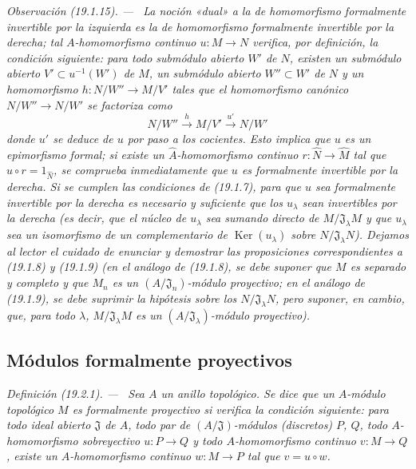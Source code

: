 \documentclass[10pt,oneside]{book}
\makeatletter
\newcommand{\setmanualcurrentlabel}[1]{\def\@currentlabel{#1}}
\newenvironment{definition}[1][]{%
  \setmanualcurrentlabel{#1}\par\medskip\noindent\itshape Definición (#1). ---\ }{\par}
\newenvironment{remark}[1][]{%
  \setmanualcurrentlabel{#1}\par\medskip\noindent\itshape Observación (#1). ---\ }{\par}
\makeatother
\begin{document}
\begin{remark}[19.1.15]
\label{0.19.1.15-es}
La noción «dual» a la de homomorfismo formalmente invertible por la izquierda
es la de homomorfismo \emph{formalmente invertible por la derecha}; tal
$A$-homomorfismo continuo $u:M\to N$ verifica, por definición, la condición
siguiente: para todo submódulo abierto $W'$ de $N$, existen un submódulo
abierto $V'\subset u^{-1}(W')$ de $M$, un submódulo abierto $W''\subset W'$ de
$N$ y un homomorfismo $h:N/W''\to M/V'$ tales que el homomorfismo canónico
$N/W''\to N/W'$ se factoriza como
\[
  N/W''\xrightarrow{h}M/V'\xrightarrow{u'}N/W'
\]
donde $u'$ se deduce de $u$ por paso a los cocientes. Esto implica que $u$ es
un epimorfismo formal; si existe un $\widehat A$-homomorfismo continuo
$r:\widehat N\to\widehat M$ tal que $\widehat u\circ r=1_{\widehat N}$, se
comprueba inmediatamente que $u$ es formalmente invertible por la derecha. Si
se cumplen las condiciones de (19.1.7), para que $u$ sea formalmente invertible
por la derecha es necesario y suficiente que los $u_\lambda$ sean invertibles
por la derecha (es decir, que el núcleo de $u_\lambda$ sea sumando directo de
$M/\mathfrak J_\lambda M$ y que $u_\lambda$ sea un isomorfismo de un
complementario de $\operatorname{Ker}(u_\lambda)$ sobre
$N/\mathfrak J_\lambda N$). Dejamos al lector el cuidado de enunciar y
demostrar las proposiciones correspondientes a (19.1.8) y (19.1.9) (en el
análogo de (19.1.8), se debe suponer que $M$ es separado y completo y que $M_n$
es un $(A/\mathfrak J_n)$-módulo proyectivo; en el análogo de (19.1.9), se debe
suprimir la hipótesis sobre los $N/\mathfrak J_\lambda N$, pero suponer, en
cambio, que, para todo $\lambda$, $M/\mathfrak J_\lambda M$ es un
$(A/\mathfrak J_\lambda)$-módulo proyectivo).
\end{remark}

\subsection{Módulos formalmente proyectivos}
\label{subsection:0.19.2-es}

\begin{definition}[19.2.1]
\label{0.19.2.1-es}
Sea $A$ un anillo topológico. Se dice que un $A$-módulo topológico $M$ es
formalmente proyectivo si verifica la condición siguiente: para todo
ideal abierto $\mathfrak J$ de $A$, todo par de $(A/\mathfrak J)$-módulos
(discretos) $P$, $Q$, todo $A$-homomorfismo sobreyectivo $u:P\to Q$ y todo
$A$-homomorfismo continuo $v:M\to Q$, existe un $A$-homomorfismo continuo
$w:M\to P$ tal que $v=u\circ w$.
\end{definition}
\end{document}
